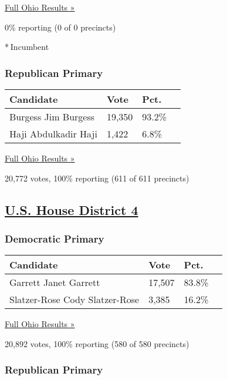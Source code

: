 \href{https://www.nytimes3xbfgragh.onion/elections/results/ohio}{Full
Ohio Results »}

0\% reporting (0 of 0 precincts)

* Incumbent

\hypertarget{republican-primary-4}{%
\subsubsection{Republican Primary}\label{republican-primary-4}}

\begin{longtable}[]{@{}llll@{}}
\toprule
Candidate & Vote & Pct. &\tabularnewline
\midrule
\endhead
 Burgess Jim Burgess & 19,350 & 93.2\% &\tabularnewline
 Haji Abdulkadir Haji & 1,422 & 6.8\% &\tabularnewline
\bottomrule
\end{longtable}

\href{https://www.nytimes3xbfgragh.onion/elections/results/ohio}{Full
Ohio Results »}

20,772 votes, 100\% reporting (611 of 611 precincts)

\hypertarget{us-house-district-4}{%
\subsection{\texorpdfstring{\href{https://www.nytimes3xbfgragh.onion/elections/results/ohio-house-district-4-primary-election}{U.S.
House District 4}}{U.S. House District 4}}\label{us-house-district-4}}

\hypertarget{democratic-primary-5}{%
\subsubsection{Democratic Primary}\label{democratic-primary-5}}

\begin{longtable}[]{@{}llll@{}}
\toprule
Candidate & Vote & Pct. &\tabularnewline
\midrule
\endhead
 Garrett Janet Garrett & 17,507 & 83.8\% &\tabularnewline
 Slatzer-Rose Cody Slatzer-Rose & 3,385 & 16.2\% &\tabularnewline
\bottomrule
\end{longtable}

\href{https://www.nytimes3xbfgragh.onion/elections/results/ohio}{Full
Ohio Results »}

20,892 votes, 100\% reporting (580 of 580 precincts)

\hypertarget{republican-primary-5}{%
\subsubsection{Republican Primary}\label{republican-primary-5}}

